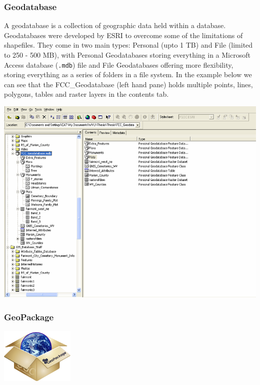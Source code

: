 \documentclass[]{book}
\begin{document}
\hypertarget{geodatabase}{%
\subsubsection{Geodatabase}\label{geodatabase}}

A geodatabase is a collection of geographic data held within a database. Geodatabases were developed by ESRI to overcome some of the limitations of shapefiles. They come in two main types: Personal (upto 1 TB) and File (limited to 250 - 500 MB), with Personal Geodatabases storing everything in a Microsoft Access database (\texttt{.mdb}) file and File Geodatabases offering more flexibility, storing everything as a series of folders in a file system. In the example below we can see that the FCC\_Geodatabase (left hand pane) holds multiple points, lines, polygons, tables and raster layers in the contents tab.

\begin{center}\includegraphics[width=500pt]{prac1_images/geodatabase} \end{center}

\hypertarget{geopackage}{%
\subsubsection{GeoPackage}\label{geopackage}}

\begin{center}\includegraphics[width=100pt]{prac1_images/geopkg} \end{center}
\end{document}
